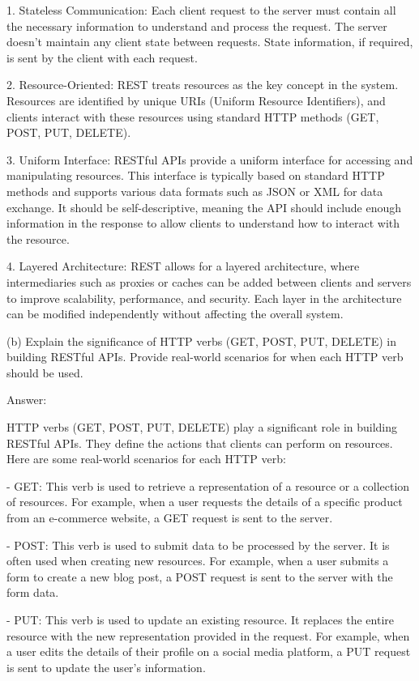 \documentclass{article}
\begin{document}
1. Stateless Communication: Each client request to the server must contain all the necessary information to understand and process the request. The server doesn't maintain any client state between requests. State information, if required, is sent by the client with each request.

2. Resource-Oriented: REST treats resources as the key concept in the system. Resources are identified by unique URIs (Uniform Resource Identifiers), and clients interact with these resources using standard HTTP methods (GET, POST, PUT, DELETE).

3. Uniform Interface: RESTful APIs provide a uniform interface for accessing and manipulating resources. This interface is typically based on standard HTTP methods and supports various data formats such as JSON or XML for data exchange. It should be self-descriptive, meaning the API should include enough information in the response to allow clients to understand how to interact with the resource.

4. Layered Architecture: REST allows for a layered architecture, where intermediaries such as proxies or caches can be added between clients and servers to improve scalability, performance, and security. Each layer in the architecture can be modified independently without affecting the overall system.

(b) Explain the significance of HTTP verbs (GET, POST, PUT, DELETE) in building RESTful APIs. Provide real-world scenarios for when each HTTP verb should be used.

Answer:

HTTP verbs (GET, POST, PUT, DELETE) play a significant role in building RESTful APIs. They define the actions that clients can perform on resources. Here are some real-world scenarios for each HTTP verb:

- GET: This verb is used to retrieve a representation of a resource or a collection of resources. For example, when a user requests the details of a specific product from an e-commerce website, a GET request is sent to the server.

- POST: This verb is used to submit data to be processed by the server. It is often used when creating new resources. For example, when a user submits a form to create a new blog post, a POST request is sent to the server with the form data.

- PUT: This verb is used to update an existing resource. It replaces the entire resource with the new representation provided in the request. For example, when a user edits the details of their profile on a social media platform, a PUT request is sent to update the user's information.
\end{document}

